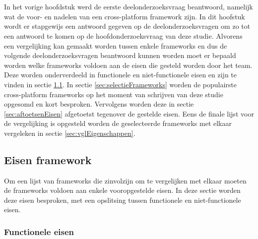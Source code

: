 
\chapter{}
\label{ch:methodologie}


In het vorige hoofdstuk werd de eerste deelonderzoeksvraag beantwoord, namelijk wat de voor- en nadelen van een cross-platform framework zijn. In dit hoofstuk wordt er stapgewijs een antwoord gegeven op de deelonderzoeksvragen om zo tot een antwoord te komen op de hoofdonderzoeksvraag van deze studie. Alvorens een vergelijking kan gemaakt worden tussen enkele frameworks en dus de volgende deelonderzoeksvragen beantwoord kunnen worden moet er bepaald worden welke frameworks voldoen aan de eisen die gesteld worden door het team. Deze worden onderverdeeld in functionele en niet-functionele eisen en zijn te vinden in sectie \ref{sec:eisen-framework}. In sectie \ref{sec:selectieFrameworks} worden de populairste cross-platform frameworks op het moment van schrijven van deze studie opgesomd en kort besproken. Vervolgens worden deze in sectie \ref{sec:aftoetsenEisen} afgetoetst tegenover de gestelde eisen. Eens de finale lijst voor de vergelijking is opgesteld worden de geselecteerde frameworks met elkaar vergeleken in sectie \ref{sec:vglEigenschappen}.

\section{Eisen framework}
\label{sec:eisen-framework}

Om een lijst van frameworks die zinvolzijn om te vergelijken met elkaar moeten de frameworks voldoen aan enkele vooropgestelde eisen. In deze sectie worden deze eisen besproken, met een opslitsing tussen functionele en niet-functionele eisen.

\subsection{Functionele eisen}
\label{subsec:functioneleEisen}

